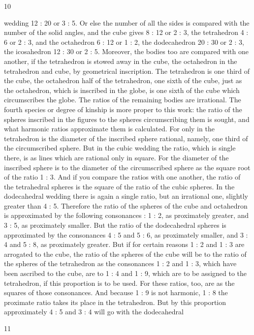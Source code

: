 \documentclass{article}
\begin{document}
10

wedding 12 : 20 or 3 : 5. Or else the number of all the sides is compared
with the number of the solid angles, and the cube gives 8 : 12 or 2 : 3, the
tetrahedron 4 : 6 or 2 : 3, and the octahedron 6 : 12 or 1 : 2, the
dodecahedron 20 : 30 or 2 : 3, the icosahedron 12 : 30 or 2 : 5.
Moreover, the bodies too are compared with one another, if the
tetrahedron is stowed away in the cube, the octahedron in the
tetrahedron and cube, by geometrical inscription. The tetrahedron is one
third of the cube, the octahedron half of the tetrahedron, one sixth of the
cube, just as the octahedron, which is inscribed in the globe, is one sixth
of the cube which circumscribes the globe. The ratios of the remaining
bodies are irrational.
The fourth species or degree of kinship is more proper to this work: the
ratio of the spheres inscribed in the figures to the spheres circumscribing
them is sought, and what harmonic ratios approximate them is
calculated. For only in the tetrahedron is the diameter of the inscribed
sphere rational, namely, one third of the circumscribed sphere. But in
the cubic wedding the ratio, which is single there, is as lines which are
rational only in square. For the diameter of the inscribed sphere is to the
diameter of the circumscribed sphere as the square root of the ratio 1 : 3.
And if you compare the ratios with one another, the ratio of the
tetrahedral spheres is the square of the ratio of the cubic spheres. In the
dodecahedral wedding there is again a single ratio, but an irrational one,
slightly greater than 4 : 5. Therefore the ratio of the spheres of the cube
and octahedron is approximated by the following consonances : 1 : 2, as
proximately greater, and
3 : 5, as proximately smaller. But the ratio of the dodecahedral spheres is
approximated by the consonances 4 : 5 and 5 : 6, as proximately smaller,
and 3 : 4 and 5 : 8, as proximately greater.
But if for certain reasons 1 : 2 and 1 : 3 are arrogated to the cube, the
ratio of the spheres of the cube will be to the ratio of the spheres of the
tetrahedron as the consonances 1 : 2 and 1 : 3, which have been ascribed
to the cube, are to 1 : 4 and 1 : 9, which are to be assigned to the
tetrahedron, if this proportion is to be used. For these ratios, too, are as
the squares of those consonances. And because 1 : 9 is not harmonic, 1 :
8 the proximate ratio takes its place in the tetrahedron. But by this
proportion approximately 4 : 5 and 3 : 4 will go with the dodecahedral


11
\end{document}
